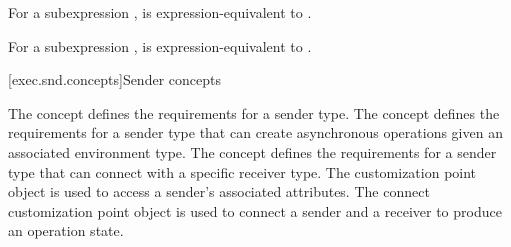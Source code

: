 \pnum
For a subexpression ,
is expres\-sion-equivalent to .

\pnum
For a subexpression ,
is expression-equivalent to .

[exec.snd.concepts]{Sender concepts}

\pnum
The  concept defines
the requirements for a sender type.
The  concept defines
the requirements for a sender type
that can create asynchronous operations given an associated environment type.
The  concept defines
the requirements for a sender type
that can connect with a specific receiver type.
The  customization point object is used to access
a sender's associated attributes.
The connect customization point object is used to connect
a sender and a receiver to produce an operation state.

